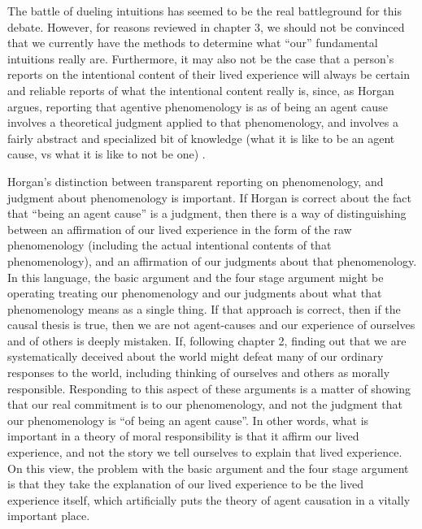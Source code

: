 \documentclass[phd,12pt,oneside,paper=letterpaper]{ubcthesis}
\begin{document}
The battle of dueling intuitions has seemed to be the real battleground for this debate. However, for reasons reviewed in chapter 3, we should not be convinced that we currently have the methods to determine what ``our'' fundamental intuitions really are. Furthermore, it may also not be the case that a person's reports on the intentional content of their lived experience will always be certain and reliable reports of what the intentional content really is, since, as Horgan argues, reporting that agentive phenomenology is as of being an agent cause involves a theoretical judgment applied to that phenomenology, and involves a fairly abstract and specialized bit of knowledge (what it is like to be an agent cause, vs what it is like to not be one) \citep{horgan2007}. 

Horgan's distinction between transparent reporting on phenomenology, and judgment about phenomenology is important. If Horgan is correct about the fact that ``being an agent cause'' is a judgment, then there is a way of distinguishing between an affirmation of our lived experience in the form of the raw phenomenology (including the actual intentional contents of that phenomenology), and an affirmation of our judgments about that phenomenology. In this language, the basic argument and the four stage argument might be operating treating our phenomenology and our judgments about what that phenomenology means as a single thing. If that approach is correct, then if the causal thesis is true, then we are not agent-causes and our experience of ourselves and of others is deeply mistaken. If, following chapter 2, finding out that we are systematically deceived about the world might defeat many of our ordinary responses to the world, including thinking of ourselves and others as morally responsible. Responding to this aspect of these arguments is a matter of showing that our real commitment is to our phenomenology, and not the judgment that our phenomenology is ``of being an agent cause''. In other words, what is important in a theory of moral responsibility is that it affirm our lived experience, and not the story we tell ourselves to explain that lived experience. On this view, the problem with the basic argument and the four stage argument is that they take the explanation of our lived experience to be the lived experience itself, which artificially puts the theory of agent causation in a vitally important place. 
\end{document}
